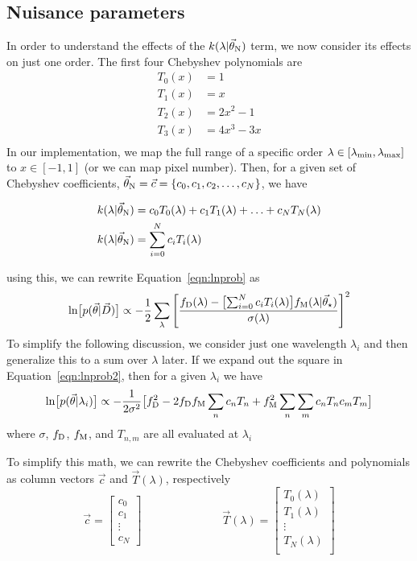 \documentclass[preprint]{aastex} %
\newcommand{\vt}{\vec{\theta}}
\newcommand{\vstar}{\vt_{\star}}
\newcommand{\vN}{\vt_{\rm N}}
\newcommand{\vc}{\vec{c}}
\newcommand{\fM}{f_{\rm M}}
\newcommand{\fD}{f_{\rm D}}
\newcommand{\vD}{\vec{D}}
\begin{document}
\subsection{Nuisance parameters}
In order to understand the effects of the $k(\lambda | \vN)$ term, we now consider its effects on just one order. The first four Chebyshev polynomials are 
\begin{align*}
  T_0(x) &= 1\\
  T_1(x) &= x\\
  T_2(x) &= 2 x^2 - 1\\
  T_3(x) &= 4 x^3 - 3x\\
\end{align*}
In our implementation, we map the full range of a specific order $\lambda \in [\lambda_{\rm min}, \lambda_{\rm max}]$ to $x \in [-1, 1]$ (or we can map pixel number). Then, for a given set of Chebyshev coefficients, $\vN = \vc = \{ c_0, c_1, c_2, \ldots, c_N \}$, we have 

\begin{align}
  k(\lambda | \vN) &= c_0 T_0(\lambda) + c_1 T_1(\lambda) + \ldots + c_N T_N(\lambda) \\
  k(\lambda | \vN) &= \sum^N_{i = 0} c_i T_i(\lambda)
\end{align}

using this, we can rewrite Equation~\ref{eqn:lnprob} as 
\begin{equation}
  \ln \bigl [p(\vt | \vD) \bigr] \propto - \frac{1}{2} \sum_\lambda \left [\frac{\fD(\lambda) - \bigl [ \sum^N_{i = 0} c_i T_i(\lambda) \bigr ]\fM(\lambda | \vstar)  }{\sigma(\lambda)} \right ]^2
  \label{eqn:lnprob2}
\end{equation}
To simplify the following discussion, we consider just one wavelength $\lambda_i$ and then generalize this to a sum over $\lambda$ later. If we expand out the square in Equation~\ref{eqn:lnprob2}, then for a given $\lambda_i$ we have
\begin{equation}
 \ln \bigl [p(\vt | \lambda_i) \bigr] \propto -\frac{1}{2 \sigma^2} \bigl [ \fD^2 - 2 \fD \fM \sum_n c_n T_n + \fM^2 \sum_n \sum_m c_n T_n c_m T_m \bigr ]
 \label{eqn:lnprob_lambda}
 \end{equation}
 where $\sigma$, $\fD$, $\fM$, and $T_{n,m}$ are all evaluated at $\lambda_i$

To simplify this math, we can rewrite the Chebyshev coefficients and polynomials as column vectors $\vc$ and $\vec{T}(\lambda)$, respectively
\begin{equation}
  \vc = 
  \begin{bmatrix}
    c_0\\
    c_1\\
    \vdots\\
    c_N
  \end{bmatrix}
  \hspace{3cm}
\vec{T}(\lambda) = 
\begin{bmatrix}
T_0(\lambda)\\
T_1(\lambda)\\
\vdots\\
T_N(\lambda)\\
\end{bmatrix}
\end{equation}
\end{document}
